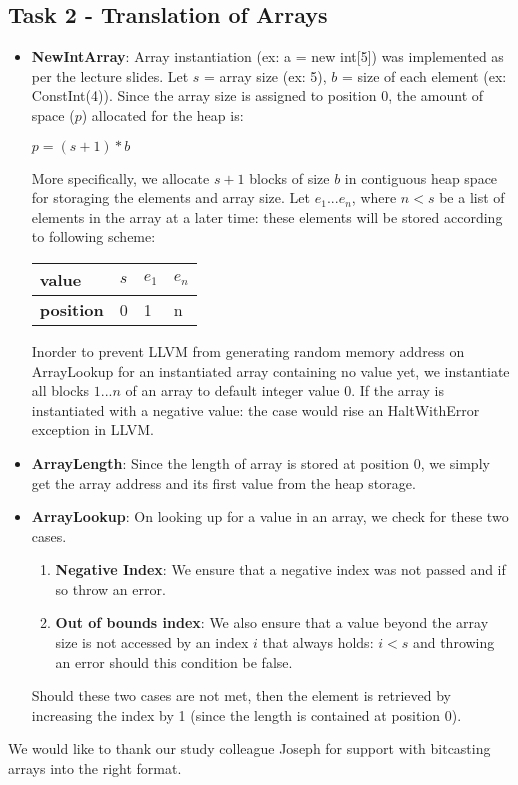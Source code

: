 \documentclass[paper=a4, fontsize=11pt]{scrartcl}
\numberwithin{equation}{section}		%
\numberwithin{figure}{section}			%
\numberwithin{table}{section}				%
\begin{document}
\subsection*{Task 2 - Translation of Arrays}
\begin{itemize}

\item \textbf{NewIntArray}: Array instantiation (ex: a = new int[5]) was implemented as per the lecture slides. Let $s$ = array size (ex: 5), $b$ = size of each element (ex: ConstInt(4)). Since the array size is assigned to position 0, the amount of space ($p$) allocated for the heap is:\\
\begin{center}
 $p = (s + 1) * b$
\end{center}
More specifically, we allocate $s + 1$ blocks of size $b$ in contiguous heap space for storaging the elements and array size. Let $e_1... e_n$, where $n < s$ be a list of elements in the array at a later time: these elements will be stored according to following scheme:
\begin{center}
\begin{table}[h]
\centering
\begin{tabular}{|l|l|l|l|}
\hline
\textbf{value}    & $s$ & $e_1$ & $e_n$ \\ \hline
\textbf{position} & 0      & 1  & n  \\ \hline
\end{tabular}
\end{table}
\end{center}
Inorder to prevent LLVM from generating random memory address on ArrayLookup for an instantiated array containing no value yet, we instantiate all blocks $1...n$ of an array to default integer value 0. 
If the array is instantiated with a negative value: the case would rise an HaltWithError exception in LLVM. 

\item \textbf{ArrayLength}: Since the length of array is stored at position 0, we simply get the array address and its first value from the heap storage.
\item \textbf{ArrayLookup}: On looking up for a value in an array, we check for these two cases.
\begin{enumerate}
	\item \textbf{Negative Index}: We ensure that a negative index was not passed and if so throw an error.
	\item \textbf{Out of bounds index}: We also ensure that a value beyond the array size is not accessed by an index $i$ that always holds: $i < s$ and throwing an error should this condition be false.
\end{enumerate}
Should these two cases are not met, then the element is retrieved by increasing the index by 1 (since the length is contained at position 0).

\end{itemize}


\begin{thebibliography}{9}%
We would like to thank our study colleague Joseph for support with bitcasting arrays into the right format.
\end{thebibliography}
\end{document}
